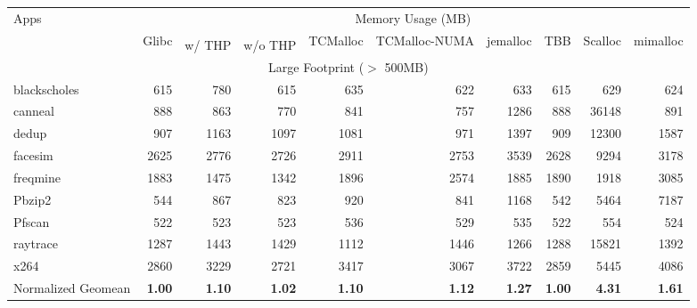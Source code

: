 \begin{table*}[tp]
\footnotesize
  \centering
    \begin{tabular}{|l|r|rr|rrrrrr|}
    \hline
    \multirow{3}{*}{Apps}&
    \multicolumn{9}{c|}{Memory Usage (MB)}\\
    \cline{2-10}
    &\multirow{2}{*}{Glibc}&\multicolumn{2}{c|}{\NM{}}&\multirow{2}{*}{TCMalloc}&\multirow{2}{*}{TCMalloc-NUMA}&\multirow{2}{*}{jemalloc}&\multirow{2}{*}{TBB}&\multirow{2}{*}{Scalloc}&\multirow{2}{*}{mimalloc} \\ \cline{3-4} 
    && w/ THP & w/o THP &&&&&& \\ \hline
    \hline
    \multicolumn{10}{|c|}{Large Footprint ($>$ 500MB)}\\ \hline
blackscholes&615&780&615&635&622&633&615&629&624\\ \hline
canneal&888&863&770&841&757&1286&888&36148&891\\ \hline
dedup&907&1163&1097&1081&971&1397&909&12300&1587\\ \hline
facesim&2625&2776&2726&2911&2753&3539&2628&9294&3178\\ \hline
freqmine&1883&1475&1342&1896&2574&1885&1890&1918&3085\\ \hline
Pbzip2&544&867&823&920&841&1168&542&5464&7187\\ \hline
Pfscan&522&523&523&536&529&535&522&554&524\\ \hline
raytrace&1287&1443&1429&1112&1446&1266&1288&15821&1392\\ \hline
x264&2860&3229&2721&3417&3067&3722&2859&5445&4086\\ \hline
\hline
Normalized Geomean &{\bf 1.00}&{\bf 1.10}&{\bf 1.02}&{\bf 1.10}&{\bf 1.12}&{\bf 1.27}&{\bf 1.00}&{\bf 4.31}&{\bf 1.61}\\ \hline


\end{tabular}
\end{table*}
